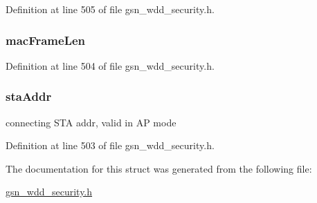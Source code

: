 Definition at line 505 of file gsn\_\-wdd\_\-security.h.

\hypertarget{a00298_a0501545f895b958ac06fac25a344c502}{
\subsubsection[{macFrameLen}]{ {\bf macFrameLen}}}
\label{a00298_a0501545f895b958ac06fac25a344c502}


Definition at line 504 of file gsn\_\-wdd\_\-security.h.

\hypertarget{a00298_a3ca54ba7eb6c301c5b6584284a9ccb8b}{
\subsubsection[{staAddr}]{ {\bf staAddr}}}
\label{a00298_a3ca54ba7eb6c301c5b6584284a9ccb8b}
connecting STA addr, valid in AP mode 

Definition at line 503 of file gsn\_\-wdd\_\-security.h.



The documentation for this struct was generated from the following file:\begin{DoxyCompactItemize}
\item 
\hyperlink{a00604}{gsn\_\-wdd\_\-security.h}\end{DoxyCompactItemize}

